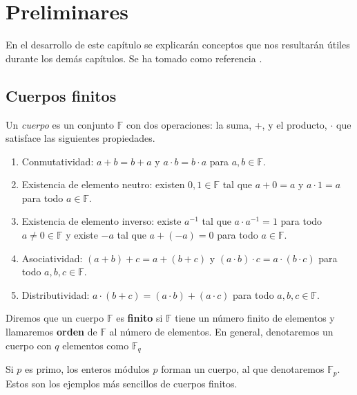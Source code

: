 
\chapter{Preliminares}

En el desarrollo de este capítulo se explicarán conceptos que nos resultarán útiles durante los demás capítulos. Se ha tomado como referencia \cite{Huffman_Pless_2010}.


\section{Cuerpos finitos}

\begin{definition}

Un \textit{cuerpo} es un conjunto $\mathbb{F}$ con dos operaciones: la suma, +, y el producto, $\cdot$ que satisface las siguientes propiedades.
\begin{enumerate}
	\item Conmutatividad: $a+b = b+a$ y $a \cdot b = b \cdot a$ para $a,b \in \mathbb{F}$.
	\item Existencia de elemento neutro: existen $0,1 \in \mathbb{F}$ tal que  $a+0 = a$ y $a \cdot 1 = a$ para todo $a \in \mathbb{F} $.
	\item Existencia de elemento inverso: existe $a^{-1}$ tal que $a \cdot a^{-1} = 1$ para todo $a \neq 0 \in \mathbb{F}$ y existe $-a$ tal que $a + (-a) = 0$ para todo $a \in \mathbb{F}$.
    \item Asociatividad: $(a+b)+c = a+(b+c)$ y $(a \cdot b) \cdot c = a \cdot (b \cdot c)$ para todo $a,b,c \in \mathbb{F}$.
    \item Distributividad: $a \cdot (b+c) = (a \cdot b) + (a \cdot c)$ para todo $a,b,c \in \mathbb{F}$.
\end{enumerate}
\end{definition}

\begin{definition}
Diremos que un cuerpo $\mathbb{F}$ es \textbf{finito} si $\mathbb{F}$ tiene un número finito de elementos y llamaremos \textbf{orden} de $\mathbb{F}$ al número de elementos. En general, denotaremos un cuerpo con $q$ elementos como $\mathbb{F}_q$
\end{definition}

Si $p$ es primo, los enteros módulos $p$ forman un cuerpo, al que denotaremos $\mathbb{F}_p$. Estos son los ejemplos más sencillos de cuerpos finitos.


